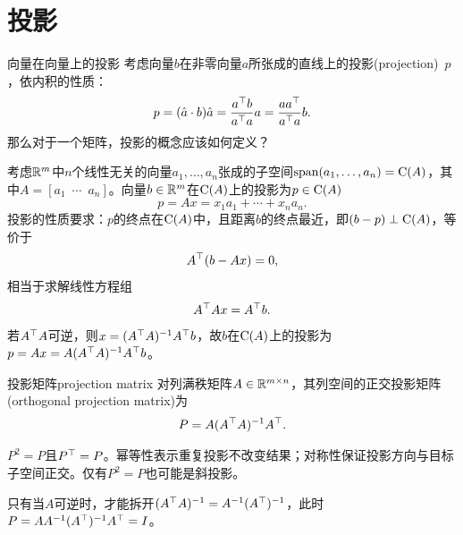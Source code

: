 \section{投影}
\begin{example}
	{向量在向量上的投影}{}
	考虑向量$b$在非零向量$a$所张成的直线上的投影(projection)~$p$，依内积的性质：
	\begin{equation}\label{eq:la-projection-onto-line}
		p = (\hat a \cdot b)\hat a = \frac{a^\top b}{a^\top a}a = \frac{aa^\top}{a^\top a}b.
	\end{equation}
	那么对于一个矩阵，投影的概念应该如何定义？
\end{example}

考虑$\mathbb{R}^m$中$n$个线性无关的向量$a_1,\ldots,a_n$张成的子空间$\operatorname{span}(a_1,\ldots,a_n) = \operatorname{C}(A)$，其中$A = [a_1\enspace\cdots\enspace a_n]$。向量$b \in \mathbb{R}^m$在$\operatorname{C}(A)$上的投影为$p \in \operatorname{C}(A)$
\[
	p = Ax = x_1a_1 + \cdots + x_na_n.
\]
投影的性质要求：$p$的终点在$\operatorname{C}(A)$中，且距离$b$的终点最近，即$(b - p) \perp \operatorname{C}(A)$，等价于
\[
	A^\top(b - Ax) = 0,
\]
相当于求解线性方程组
\begin{equation}\label{eq:la-projection-normal-equations}
	A^\top Ax = A^\top b.
\end{equation}
若$A^\top A$可逆，则$x = (A^\top A)^{-1} A^\top b$，故$b$在$\operatorname{C}(A)$上的投影为$p = Ax = A(A^\top A)^{-1} A^\top b$。
\begin{definition}
	{投影矩阵}{projection matrix}
	对列满秩矩阵$A \in \mathbb{R}^{m\times n}$，其列空间的正交投影矩阵(orthogonal projection matrix)为
	\begin{align}
		P = A(A^\top A)^{-1} A^\top.
	\end{align}
\end{definition}

\begin{corollary}
	$P^2 = P$且$P^\top = P$。幂等性表示重复投影不改变结果；对称性保证投影方向与目标子空间正交。仅有$P^2 = P$也可能是斜投影。
\end{corollary}

\begin{remark}
	只有当$A$可逆时，才能拆开$(A^\top A)^{-1} = A^{-1}(A^\top)^{-1}$，此时$P = AA^{-1}(A^\top)^{-1} A^\top = I$。
\end{remark}


